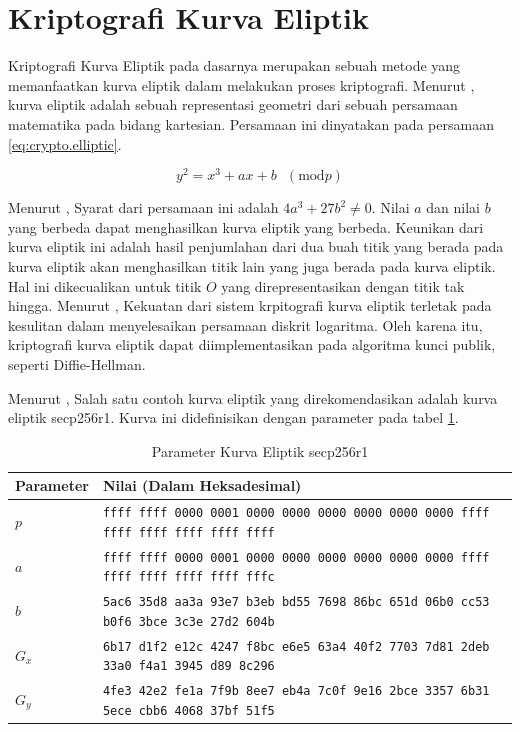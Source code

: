 \section{Kriptografi Kurva Eliptik}
Kriptografi Kurva Eliptik pada dasarnya merupakan sebuah metode yang memanfaatkan kurva eliptik dalam melakukan proses kriptografi. Menurut \textcite{betaccini2022}, kurva eliptik adalah sebuah representasi geometri dari sebuah persamaan matematika pada bidang kartesian. Persamaan ini dinyatakan pada persamaan \ref{eq:crypto.elliptic}.

\begin{equation}
  \label{eq:crypto.elliptic}
  y^2 = x^3 + ax + b\text{ }(\text{mod} p)
\end{equation}

Menurut \textcite{munir2019}, Syarat dari persamaan ini adalah $4a^3 + 27b^2 \neq 0$. Nilai $a$ dan nilai $b$ yang berbeda dapat menghasilkan kurva eliptik yang berbeda. Keunikan dari kurva eliptik ini adalah hasil penjumlahan dari dua buah titik yang berada pada kurva eliptik akan menghasilkan titik lain yang juga berada pada kurva eliptik. Hal ini dikecualikan untuk titik $O$ yang direpresentasikan dengan titik tak hingga. Menurut \textcite{betaccini2022}, Kekuatan dari sistem krpitografi kurva eliptik terletak pada kesulitan dalam menyelesaikan persamaan diskrit logaritma. Oleh karena itu, kriptografi kurva eliptik dapat diimplementasikan pada algoritma kunci publik, seperti Diffie-Hellman.

Menurut \textcite{certicom2000}, Salah satu contoh kurva eliptik yang direkomendasikan adalah kurva eliptik secp256r1. Kurva ini didefinisikan dengan parameter pada tabel \ref{tab:crypto.secp256r1}.

\begin{table}[!h]
  \centering
  \caption{Parameter Kurva Eliptik secp256r1}
  \label{tab:crypto.secp256r1}
  \begin{tabular}{|p{1in}|p{4in}|}
    \hline
    \textbf{Parameter} & \textbf{Nilai (Dalam Heksadesimal)} \\
    \hline
    $p$ & \texttt{ffff ffff 0000 0001 0000 0000 0000 0000 0000 0000 ffff ffff ffff ffff ffff ffff} \\ \hline
    $a$ & \texttt{ffff ffff 0000 0001 0000 0000 0000 0000 0000 0000 ffff ffff ffff ffff ffff fffc} \\ \hline
    $b$ & \texttt{5ac6 35d8 aa3a 93e7 b3eb bd55 7698 86bc 651d 06b0 cc53 b0f6 3bce 3c3e 27d2 604b} \\ \hline
    $G_x$ & \texttt{6b17 d1f2 e12c 4247 f8bc e6e5 63a4 40f2 7703 7d81 2deb 33a0 f4a1 3945 d89 8c296} \\ \hline 
    $G_y$ & \texttt{4fe3 42e2 fe1a 7f9b 8ee7 eb4a 7c0f 9e16 2bce 3357 6b31 5ece cbb6 4068 37bf 51f5} \\ \hline
  \end{tabular}
\end{table}

